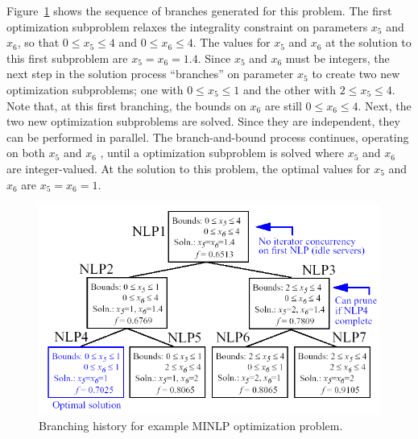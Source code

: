 
Figure~\ref{strat:figure07} shows the sequence of branches generated
for this problem.  The first optimization subproblem relaxes the
integrality constraint on parameters $x_{5}$ and $x_{6}$, so that $0
\leq x_{5} \leq 4$ and $0 \leq x_{6} \leq 4$. The values for $x_{5}$
and $x_{6}$ at the solution to this first subproblem are
$x_{5}=x_{6}=1.4$.  Since $x_{5}$ and $x_{6}$ must be integers, the
next step in the solution process ``branches'' on parameter $x_{5}$ to
create two new optimization subproblems; one with $0 \leq x_{5} \leq
1$ and the other with $2 \leq x_{5} \leq 4$.  Note that, at this first
branching, the bounds on $x_{6}$ are still $0 \leq x_{6} \leq 4$.
Next, the two new optimization subproblems are solved.  Since they are
independent, they can be performed in parallel.  The branch-and-bound
process continues, operating on both $x_{5}$ and $x_{6}$ , until a
optimization subproblem is solved where $x_{5}$ and $x_{6}$ are
integer-valued. At the solution to this problem, the optimal values
for $x_{5}$ and $x_{6}$ are $x_{5}=x_{6}=1$.

\begin{figure}
  \centering
  \includegraphics[scale=0.75]{images/branch_history}
  \caption{Branching history for example MINLP optimization problem.}
  \label{strat:figure07}
\end{figure}

